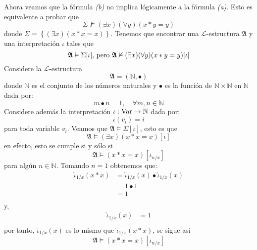 \documentclass[12pt]{article}
\newcounter{it}
\theoremstyle{largebreak}
\newcommand\cf[3]{\ensuremath{#1:#2\rightarrow#3}}
\begin{document}
\begin{sol}
        Ahora veamos que la fórmula \textit{(b)} no implica lógicamente a la fórmula \textit{(a)}. Esto es equivalente a probar que
        \begin{equation*}
            \Sigma\nvDash (\exists x)(\forall y)(x*y=y)
        \end{equation*}
        donde $\Sigma=\left\{(\exists x)(x*x=x) \right\}$. Tenemos que encontrar una $\mathcal{L}$-estructura $\mathfrak{A}$ y una interpretación $\iota$ tales que
        \begin{equation*}
            \mathfrak{A}\vDash\Sigma[\iota]\textup{, pero }\mathfrak{A}\nvDash (\exists x)(\forall y)(x*y=y)[\iota]
        \end{equation*}
        Considere la $\mathcal{L}$-estructura
        \begin{equation*}
            \mathfrak{A}=(\mathbb{N},\bullet)
        \end{equation*}
        donde $\mathbb{N}$ es el conjunto de los números naturales y $\bullet$ es la función de $\mathbb{N}\times\mathbb{N}$ en $\mathbb{N}$ dada por:
        \begin{equation*}
            m\bullet n=1,\quad\forall m,n\in\mathbb{N}
        \end{equation*}
        Considere además la interpretación $\cf{\iota}{\textup{Var}}{\mathbb{N}}$ dada por:
        \begin{equation*}
            \iota(v_i)=i
        \end{equation*}
        para toda variable $v_i$. Veamos que $\mathfrak{A}\vDash\Sigma[\iota]$, esto es que
        \begin{equation*}
            \mathfrak{A}\vDash(\exists x)(x*x=x)[\iota]
        \end{equation*}
        en efecto, esto se cumple si y sólo si
        \begin{equation*}
            \mathfrak{A}\vDash(x*x=x)[\iota_{n/x}]
        \end{equation*}
        para algún $n\in\mathbb{N}$. Tomando $n=1$ obtenemos que:
        \begin{equation*}
            \begin{split}
                \hat{\iota}_{1/x}(x*x)&=\hat{\iota}_{1/x}(x)\bullet\hat{\iota}_{1/x}(x)\\
                &=1\bullet 1\\
                &=1\\
            \end{split}
        \end{equation*}
        y,
        \begin{equation*}
            \begin{split}
                \hat{\iota}_{1/x}(x)&=1\\
            \end{split}
        \end{equation*}
        por tanto, $\hat{\iota}_{1/x}(x)$ es lo mismo que $\hat{\iota}_{1/x}(x*x)$, se sigue así
        \begin{equation*}
            \mathfrak{A}\vDash(x*x=x)[\iota_{n/x}]
        \end{equation*}


\end{sol}
\end{document}
